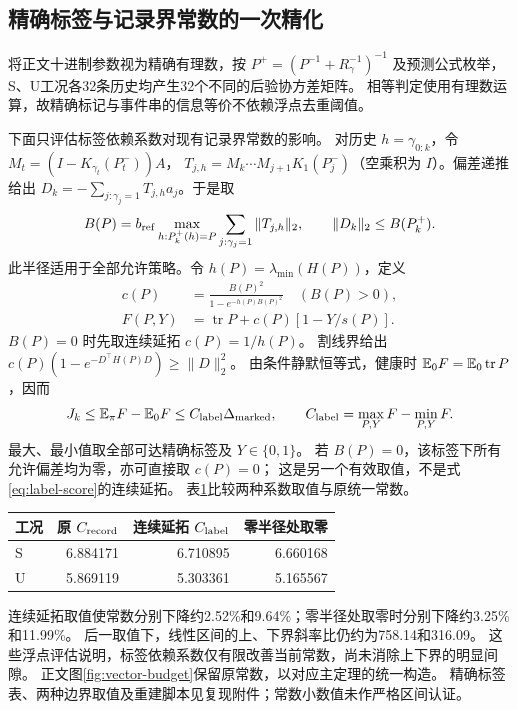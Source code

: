 \subsection{精确标签与记录界常数的一次精化}
\label{app:label-refinement}
将正文十进制参数视为精确有理数，按
$P^+=(P^{-1}+R_\gamma^{-1})^{-1}$ 及预测公式枚举，
S、U工况各32条历史均产生32个不同的后验协方差矩阵。
相等判定使用有理数运算，故精确标记与事件串的信息等价不依赖浮点去重阈值。

下面只评估标签依赖系数对现有记录界常数的影响。
对历史 $h=\gamma_{0:k}$，令 $M_t=(I-K_{\gamma_t}(P_t^-))A$，
$T_{j,h}=M_k\cdots M_{j+1}K_1(P_j^-)$（空乘积为 $I$）。偏差递推给出
$D_k=-\sum_{j:\gamma_j=1}T_{j,h}a_j$。于是取
\begin{equation}
 B(P)=b_{\rm ref}\max_{h:P_k^+(h)=P}\sum_{j:\gamma_j=1}\|T_{j,h}\|_2,
 \qquad \|D_k\|_2\le B(P_k^+).
 \label{eq:label-radius}
\end{equation}
此半径适用于全部允许策略。令 $h(P)=\lambda_{\min}(H(P))$，定义
\begin{equation}
 \begin{aligned}
 c(P)&=\frac{B(P)^2}{1-e^{-h(P)B(P)^2}}\quad(B(P)>0),\\
 F(P,Y)&=\operatorname{tr}P+c(P)[1-Y/s(P)].
 \end{aligned}
 \label{eq:label-score}
\end{equation}
$B(P)=0$ 时先取连续延拓 $c(P)=1/h(P)$。
割线界给出 $c(P)(1-e^{-D^\top H(P)D})\ge\|D\|_2^2$。
由条件静默恒等式，健康时 $\mathbb E_0F=\mathbb E_0\operatorname{tr}P$，因而
\begin{equation}
 J_k\le\mathbb E_\pi F-\mathbb E_0F\le C_{\rm label}\Delta_{\rm marked},
 \qquad C_{\rm label}=\max_{P,Y}F-\min_{P,Y}F.
 \label{eq:label-bound}
\end{equation}
最大、最小值取全部可达精确标签及 $Y\in\{0,1\}$。
若 $B(P)=0$，该标签下所有允许偏差均为零，亦可直接取 $c(P)=0$；
这是另一个有效取值，不是式\eqref{eq:label-score}的连续延拓。
表\ref{tab:label-constants}比较两种系数取值与原统一常数。
\begin{table}[H]
\centering\small
{}
\label{tab:label-constants}
\begin{tabular}{lrrr}
\toprule
工况 & 原 $C_{\rm record}$ & 连续延拓 $C_{\rm label}$ & 零半径处取零\\
\midrule
S & 6.884171 & 6.710895 & 6.660168\\
U & 5.869119 & 5.303361 & 5.165567\\
\bottomrule
\end{tabular}
\end{table}
连续延拓取值使常数分别下降约2.52\%和9.64\%；零半径处取零时分别下降约3.25\%和11.99\%。
后一取值下，线性区间的上、下界斜率比仍约为758.14和316.09。
这些浮点评估说明，标签依赖系数仅有限改善当前常数，尚未消除上下界的明显间隙。
正文图\ref{fig:vector-budget}保留原常数，以对应主定理的统一构造。
精确标签表、两种边界取值及重建脚本见复现附件；常数小数值未作严格区间认证。
